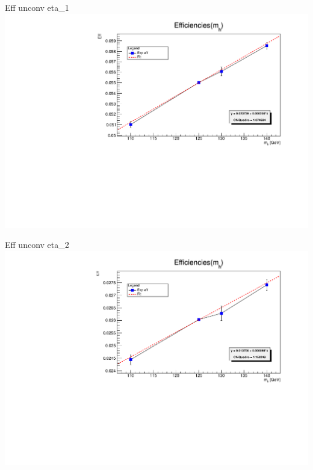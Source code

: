 \documentclass[10pt,UKenglish, leqno, xcolor = dvipsnames]{beamer}
\begin{document}
		\begin{frame}{Eff unconv eta\_1}
			\vfill
			\includegraphics[width=1.\textwidth]{../images/week_9/efficiencies_fit_unconv_eta_1.pdf}
			\vfill
		\end{frame}
	
		\begin{frame}{Eff unconv eta\_2}
			\vfill
			\includegraphics[width=1.\textwidth]{../images/week_9/efficiencies_fit_unconv_eta_2.pdf}
			\vfill
		\end{frame}
	
\end{document}
